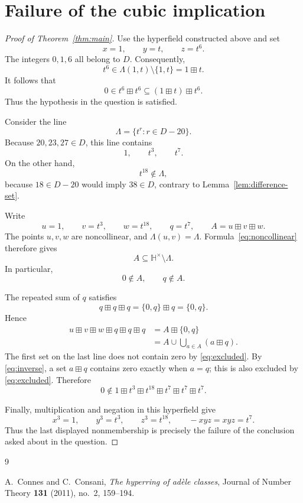 \documentclass[11pt]{article}
\newcommand{\HH}{\mathbb{H}}
\begin{document}
\section{Failure of the cubic implication}

\begin{proof}[Proof of Theorem~\ref{thm:main}]
Use the hyperfield constructed above and set
\[
    x=1,\qquad y=t,\qquad z=t^6.
\]
The integers \(0,1,6\) all belong to \(D\). Consequently,
\[
    t^6\in\Lambda(1,t)\setminus\{1,t\}=1\boxplus t.
\]
It follows that
\[
    0\in t^6\boxplus t^6
      \subseteq (1\boxplus t)\boxplus t^6.
\]
Thus the hypothesis in the question is satisfied.

Consider the line
\[
    \Lambda=\{t^r:r\in D-20\}.
\]
Because \(20,23,27\in D\), this line contains
\[
    1,\qquad t^3,\qquad t^7.
\]
On the other hand,
\[
    t^{18}\notin\Lambda,
\]
because \(18\in D-20\) would imply \(38\in D\), contrary to
Lemma~\ref{lem:difference-set}.

Write
\[
    u=1,\qquad v=t^3,\qquad w=t^{18},\qquad q=t^7,
    \qquad A=u\boxplus v\boxplus w.
\]
The points \(u,v,w\) are noncollinear, and
\(\Lambda(u,v)=\Lambda\). Formula~\eqref{eq:noncollinear} therefore gives
\[
    A\subseteq\HH^\times\setminus\Lambda.
\]
In particular,
\begin{equation}\label{eq:excluded}
    0\notin A,\qquad q\notin A.
\end{equation}

The repeated sum of \(q\) satisfies
\[
    q\boxplus q\boxplus q
    =\{0,q\}\boxplus q
    =\{0,q\}.
\]
Hence
\[
\begin{split}
    u\boxplus v\boxplus w\boxplus q\boxplus q\boxplus q
    &=A\boxplus\{0,q\}\\
    &=A\cup\bigcup_{a\in A}(a\boxplus q).
\end{split}
\]
The first set on the last line does not contain zero by
\eqref{eq:excluded}. By \eqref{eq:inverse}, a set \(a\boxplus q\)
contains zero exactly when \(a=q\); this is also excluded by
\eqref{eq:excluded}. Therefore
\[
    0\notin
    1\boxplus t^3\boxplus t^{18}
      \boxplus t^7\boxplus t^7\boxplus t^7.
\]

Finally, multiplication and negation in this hyperfield give
\[
    x^3=1,\qquad y^3=t^3,\qquad z^3=t^{18},
    \qquad -xyz=xyz=t^7.
\]
Thus the last displayed nonmembership is precisely the failure of the
conclusion asked about in the question.
\end{proof}

\begin{thebibliography}{9}

A.~Connes and C.~Consani,
\emph{The hyperring of ad\`ele classes},
Journal of Number Theory \textbf{131} (2011), no.~2, 159--194.

\end{thebibliography}
\end{document}
